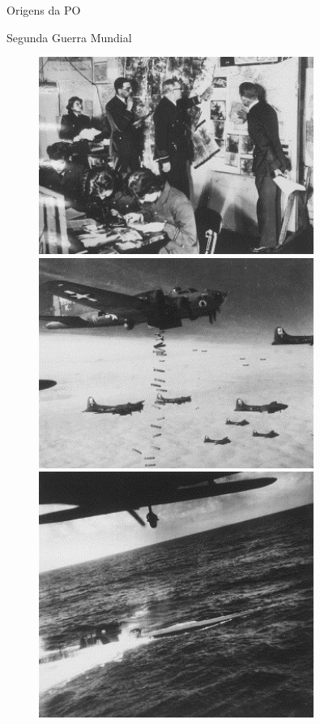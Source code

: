 \documentclass[compress]{beamer}
\begin{document}
\begin{frame}{Origens da PO}

Segunda Guerra Mundial

\begin{figure}
    \begin{overprint}
    \centering\includegraphics[width=0.80\textwidth]{images/ww2_1.jpg}
    \centering\includegraphics[width=0.80\textwidth]{images/ww2_2.jpg}
    \centering\includegraphics[width=0.80\textwidth]{images/ww2_3.jpg}
    \end{overprint}
\end{figure}
\end{frame}
\end{document}
